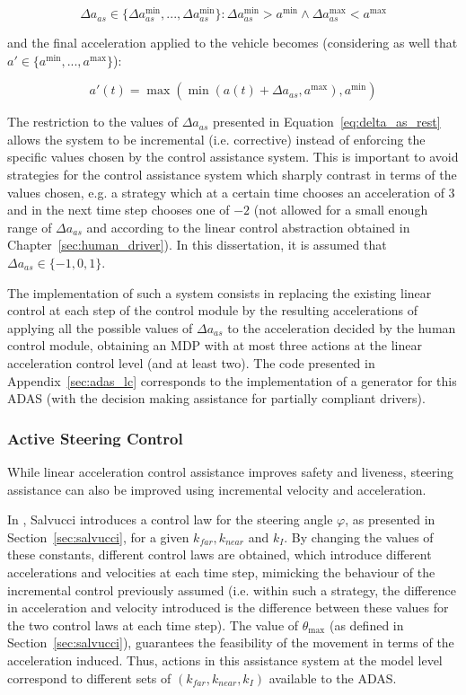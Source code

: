 \begin{equation}
\label{eq:delta_as_rest}
	\Delta a_{as} \in \{\Delta a_{as}^{\min},...,\Delta a_{as}^{\min}\}: \Delta a_{as}^{\min} > a^{\min} \wedge \Delta a_{as}^{\max} < a^{\max}
\end{equation}

and the final acceleration applied to the vehicle becomes (considering as well that $a' \in \{a^{\min},...,a^{\max}\}$):

\begin{equation}
	a'(t) = \max (\min (a(t) + \Delta a_{as}, a^{\max}), a^{\min})
\end{equation}

The restriction to the values of $\Delta a_{as}$ presented in Equation~\ref{eq:delta_as_rest} allows the system to be incremental (i.e. corrective) instead of enforcing the specific values chosen by the control assistance system. This is important to avoid strategies for the control assistance system which sharply contrast in terms of the values chosen, e.g. a strategy which at a certain time chooses an acceleration of $3$ and in the next time step chooses one of $-2$ (not allowed for a small enough range of $\Delta a_{as}$ and according to the linear control abstraction obtained in Chapter~\ref{sec:human_driver}). In this dissertation, it is assumed that $\Delta a_{as} \in \{-1,0,1\}$.

The implementation of such a system consists in replacing the existing linear control at each step of the control module by the resulting accelerations of applying all the possible values of $\Delta a_{as}$ to the acceleration decided by the human control module, obtaining an MDP with at most three actions at the linear acceleration control level (and at least two). The code presented in Appendix~\ref{sec:adas_lc} corresponds to the implementation of a generator for this ADAS (with the decision making assistance for partially compliant drivers).

\subsubsection{Active Steering Control}

While linear acceleration control assistance improves safety and liveness, steering assistance can also be improved using incremental velocity and acceleration. 

In \cite{salvucci_1}, Salvucci introduces a control law for the steering angle $\varphi$, as presented in Section~\ref{sec:salvucci}, for a given $k_{far}, k_{near}$ and $k_I$. By changing the values of these constants, different control laws are obtained, which introduce different accelerations and velocities at each time step, mimicking the behaviour of the incremental control previously assumed (i.e. within such a strategy, the difference in acceleration and velocity introduced is the difference between these values for the two control laws at each time step). The value of $\theta_{\max}$ (as defined in Section~\ref{sec:salvucci}), guarantees the feasibility of the movement in terms of the acceleration induced. Thus, actions in this assistance system at the model level correspond to different sets of $(k_{far}, k_{near},k_I)$ available to the ADAS.

